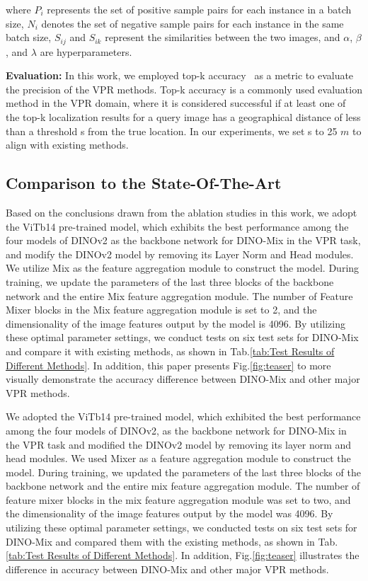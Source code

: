 where $P_{i}$ represents the set of positive sample pairs for each instance in a batch size,  $N_{i}$ denotes the set of negative sample pairs for each instance in the same batch size, $S_{ij}$ and $S_{ik}$ represent the similarities between the two images, and $\alpha$, $\beta$, and $\lambda$ are hyperparameters.

\textbf{Evaluation:} In this work, we employed top-k accuracy~\cite{huang_survey_2023} as a metric to evaluate the precision of the VPR methods. Top-k accuracy is a commonly used evaluation method in the VPR domain, where it is considered successful if at least one of the top-k localization results for a query image has a geographical distance of less than a threshold s from the true location. In our experiments, we set s to 25 $m$ to align with existing methods.

\subsection{Comparison to the State-Of-The-Art}
\label{Comparison to the state-of-the-art}

Based on the conclusions drawn from the ablation studies in this work, we adopt the ViTb14 pre-trained model, which exhibits the best performance among the four models of DINOv2 as the backbone network for DINO-Mix in the VPR task, and modify the DINOv2 model by removing its Layer Norm and Head modules. We utilize Mix as the feature aggregation module to construct the model. During training, we update the parameters of the last three blocks of the backbone network and the entire Mix feature aggregation module. The number of Feature Mixer blocks in the Mix feature aggregation module is set to 2, and the dimensionality of the image features output by the model is 4096. By utilizing these optimal parameter settings, we conduct tests on six test sets for DINO-Mix and compare it with existing methods, as shown in Tab.\ref{tab:Test Results of Different Methods}. In addition, this paper presents Fig.\ref{fig:teaser} to more visually demonstrate the accuracy difference between DINO-Mix and other major VPR methods.

We adopted the ViTb14 pre-trained model, which exhibited the best performance among the four models of DINOv2, as the backbone network for DINO-Mix in the VPR task and modified the DINOv2 model by removing its layer norm and head modules. We used Mixer as a feature aggregation module to construct the model. During training, we updated the parameters of the last three blocks of the backbone network and the entire mix feature aggregation module. The number of feature mixer blocks in the mix feature aggregation module was set to two, and the dimensionality of the image features output by the model was 4096. By utilizing these optimal parameter settings, we conducted tests on six test sets for DINO-Mix and compared them with the existing methods, as shown in Tab.\ref{tab:Test Results of Different Methods}. In addition, Fig.\ref{fig:teaser} illustrates the difference in accuracy between DINO-Mix and other major VPR methods.


